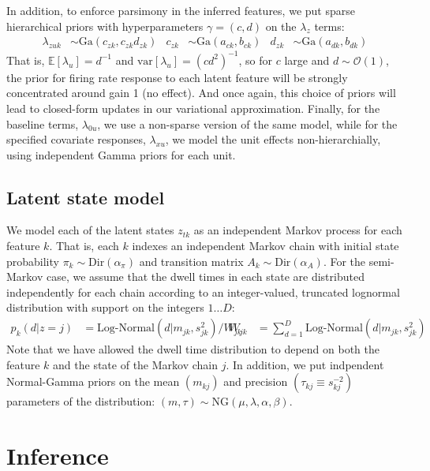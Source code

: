 \documentclass{article} %
\begin{document}
In addition, to enforce parsimony in the inferred features, we put sparse hierarchical priors with hyperparameters $\gamma = (c, d)$ on the $\lambda_z$ terms:
\begin{align}
    \label{hierarchy}
    \lambda_{zuk} &\sim \text{Ga}(c_{zk}, c_{zk} d_{zk}) & c_{zk} &\sim \text{Ga}(a_{ck}, b_{ck})
    & d_{zk} &\sim \text{Ga}(a_{dk}, b_{dk})
\end{align}
That is, $\mathbb{E}[\lambda_u] = d^{-1}$ and $\text{var}[\lambda_u] = (cd^2)^{-1}$, so for $c$ large and $d\sim \mathcal{O}(1)$, the prior for firing rate response to each latent feature will be strongly concentrated around gain 1 (no effect). And once again, this choice of priors will lead to closed-form updates in our variational approximation. Finally, for the baseline terms, $\lambda_{0u}$, we use a non-sparse version of the same model, while for the specified covariate responses, $\lambda_{xu}$, we model the unit effects non-hierarchially, using independent Gamma priors for each unit.

\subsection{Latent state model}
We model each of the latent states $z_{tk}$ as an independent Markov process for each feature $k$. That is, each $k$ indexes an independent Markov chain with initial state probability $\pi_k\sim \text{Dir}(\alpha_\pi)$ and transition matrix $A_k\sim \text{Dir}(\alpha_A)$. For the semi-Markov case, we assume that the dwell times in each state are distributed independently for each chain according to an integer-valued, truncated lognormal distribution with support on the integers $1\dots D$:
\begin{align}
    \label{semi-markov}
    p_k(d|z = j) &= \text{Log-Normal}(d|m_{jk}, s^2_{jk}) / W_{jk}  &
    W_{jk} &= \sum_{d = 1}^D \text{Log-Normal}(d|m_{jk}, s^2_{jk}) 
\end{align}
Note that we have allowed the dwell time distribution to depend on both the feature $k$ and the state of the Markov chain $j$. In addition, we put indpendent Normal-Gamma priors on the mean $(m_{kj})$ and precision $(\tau_{kj} \equiv s_{kj}^{-2})$ parameters of the distribution: $(m, \tau) \sim \text{NG}(\mu, \lambda, \alpha, \beta)$.

\section{Inference}
\end{document}

